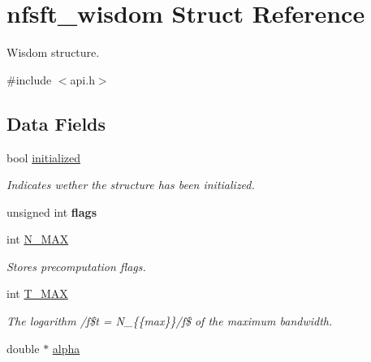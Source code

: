 \hypertarget{structnfsft__wisdom}{\section{nfsft\-\_\-wisdom Struct Reference}
\label{structnfsft__wisdom}
}


Wisdom structure.  




{\ttfamily \#include $<$api.\-h$>$}

\subsection*{Data Fields}
\begin{DoxyCompactItemize}
\item 
bool \hyperlink{structnfsft__wisdom_abb3162b2e1faa123a9ef70f1374aa740}{initialized}
\begin{DoxyCompactList}\small\item\em Indicates wether the structure has been initialized. \end{DoxyCompactList}\item 
\hypertarget{structnfsft__wisdom_a267b5c83fbfef2212669a2f61960e3d4}{unsigned int {\bfseries flags}}\label{structnfsft__wisdom_a267b5c83fbfef2212669a2f61960e3d4}

\item 
int \hyperlink{structnfsft__wisdom_ac0d21110fe9475646b8174b1048cda51}{N\-\_\-\-M\-A\-X}
\begin{DoxyCompactList}\small\item\em Stores precomputation flags. \end{DoxyCompactList}\item 
\hypertarget{structnfsft__wisdom_ae6c31fe1bc09d2894948358c2bea27e4}{int \hyperlink{structnfsft__wisdom_ae6c31fe1bc09d2894948358c2bea27e4}{T\-\_\-\-M\-A\-X}}\label{structnfsft__wisdom_ae6c31fe1bc09d2894948358c2bea27e4}

\begin{DoxyCompactList}\small\item\em The logarithm /f\$t =  N\-\_\-\{\{max\}\}/f\$ of the maximum bandwidth. \end{DoxyCompactList}\item 
\hypertarget{structnfsft__wisdom_a755da8bd28cc1322415bd0ddcfceaf4e}{double $\ast$ \hyperlink{structnfsft__wisdom_a755da8bd28cc1322415bd0ddcfceaf4e}{alpha}}\label{structnfsft__wisdom_a755da8bd28cc1322415bd0ddcfceaf4e}


\end{DoxyCompactItemize}

